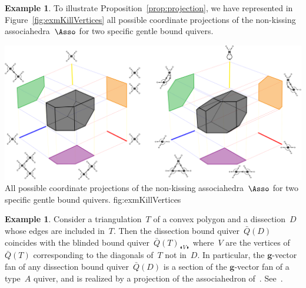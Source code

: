 \documentclass{memo-l}
\theoremstyle{definition}
\newtheorem{example}[theorem]{Example}
\renewcommand{\b}[1]{\mathbf{#1}} %
\newcommand{\fref}[1]{Figure~\ref{#1}} %
\newcommand{\blinkers}[1]{_{\LEFTCIRCLE \!\! #1 \!\! \RIGHTCIRCLE}} %
\begin{document}
\begin{example}
To illustrate Proposition~\ref{prop:projection}, we have represented in \fref{fig:exmKillVertices} all possible coordinate projections of the non-kissing associahedra~$\Asso$ for two specific gentle bound quivers.

\captionsetup{width=1.5\textwidth}
{\includegraphics[scale=.34]{exmKillVertices}}
{All possible coordinate projections of the non-kissing associahedra~$\Asso$ for two specific gentle bound quivers.}
{fig:exmKillVertices}
\captionsetup{width=\textwidth}

\end{example}

\begin{example}
Consider a triangulation~$T$ of a convex polygon and a dissection~$D$ whose edges are included in~$T$.
Then the dissection bound quiver~$\bar Q(D)$ coincides with the blinded bound quiver~$\bar Q(T)\blinkers{V}$ where~$V$ are the vertices of~$\bar Q(T)$ corresponding to the diagonals of~$T$ not in~$D$.
In particular, the $\b{g}$-vector fan of any dissection bound quiver~$\bar Q(D)$ is a section of the $\b{g}$-vector fan of a type~$A$ quiver, and is realized by a projection of the associahedron of~\cite{HohlwegPilaudStella}.
See~\cite{PilaudPlamondonStella}.
\end{example}

\end{document}
